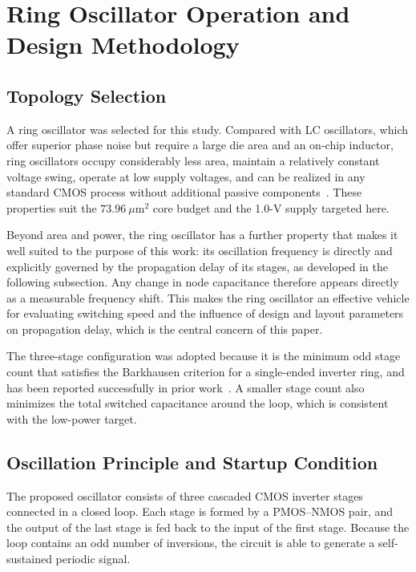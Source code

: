 \documentclass[conference,a4paper]{IEEEtran} %
\begin{document}
\section{Ring Oscillator Operation and Design Methodology}

\subsection{Topology Selection}

A ring oscillator was selected for this study. Compared with LC oscillators,
which offer superior phase noise but require a large die area and an on-chip
inductor, ring oscillators occupy considerably less area, maintain a relatively
constant voltage swing, operate at low supply voltages, and can be realized in
any standard CMOS process without additional passive
components~\cite{razavi_analog, lee_cmos}. These properties suit the
$73.96~\mu\text{m}^2$ core budget and the 1.0-V supply targeted here.

Beyond area and power, the ring oscillator has a further property that makes it
well suited to the purpose of this work: its oscillation frequency is directly
and explicitly governed by the propagation delay of its stages, as developed in
the following subsection. Any change in node capacitance therefore appears
directly as a measurable frequency shift. This makes the ring oscillator an
effective vehicle for evaluating switching speed and the influence of design and
layout parameters on propagation delay, which is the central concern of this
paper.

The three-stage configuration was adopted because it is the minimum odd stage
count that satisfies the Barkhausen criterion for a single-ended inverter ring,
and has been reported successfully in prior work~\cite{nugroho_ring}. A smaller
stage count also minimizes the total switched capacitance around the loop,
which is consistent with the low-power target.

\subsection{Oscillation Principle and Startup Condition}
The proposed oscillator consists of three cascaded CMOS inverter stages
connected in a closed loop. Each stage is formed by a PMOS--NMOS pair, and the
output of the last stage is fed back to the input of the first stage. Because the
loop contains an odd number of inversions, the circuit is able to generate a
self-sustained periodic signal.
\end{document}
